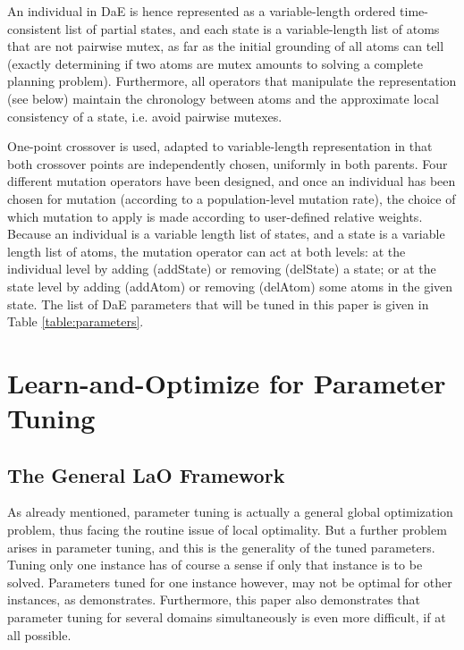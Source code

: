 \documentclass{MYsig-alternate}
\begin{document}
An individual in DaE is hence represented as a variable-length ordered time-consistent list of partial states, and each state is a variable-length list of atoms that are not pairwise mutex, as far as the initial grounding of all atoms  can tell (exactly determining if two atoms are mutex amounts to solving a complete planning problem). Furthermore, all operators that manipulate the representation (see below) maintain the chronology between atoms and the approximate local consistency of a state, i.e. avoid pairwise mutexes.

One-point crossover is used, adapted to variable-length representation in that both crossover points are independently chosen, uniformly in both parents.
Four different mutation operators have been designed, and once an individual has been chosen for mutation (according to a population-level mutation rate), the choice of which mutation to apply is made according to user-defined relative weights. 
Because an individual is a variable length list of states, and a state is a variable length list of atoms, the mutation 
operator can act at both levels: at the individual level by adding (addState) or removing (delState) 
a state; or at the state level by adding (addAtom) or removing (delAtom) some atoms in the given state. 
The list of DaE parameters that will be tuned in this paper is given in Table \ref{table:parameters}.


\section{Learn-and-Optimize for Parameter Tuning}
\label{section:LaO}

\subsection{The General LaO Framework}

As already mentioned, parameter tuning is actually a general global optimization problem, thus facing the routine issue of local optimality. But a further problem arises in parameter tuning, and this is the generality of the tuned parameters. Tuning only one instance has of course a sense if only that instance is to be solved. Parameters tuned for one instance however, may not be optimal for other instances, as \cite{BibGECCO:2010} demonstrates. Furthermore, this paper also demonstrates that parameter tuning for several domains simultaneously is even more difficult, if at all possible.
\end{document}
